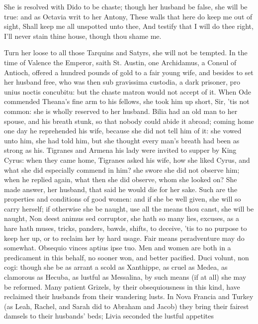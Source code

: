 {She is resolved with Dido to be chaste; though her husband be false,
she will be true: and as Octavia writ to her Antony,
These walls that here do keep me out of sight,
Shall keep me all unspotted unto thee,
And testify that I will do thee right,
I'll never stain thine house, though thou shame me.

Turn her loose to all those Tarquins and Satyrs, she will not be
tempted. In the time of Valence the Emperor, saith St. Austin,
one Archidamus, a Consul of Antioch, offered a hundred pounds of gold
to a fair young wife, and besides to set her husband free, who was then
sub gravissima custodia, a dark prisoner, pro unius noctis concubitu:
but the chaste matron would not accept of it. When Ode commended
Theana's fine arm to his fellows, she took him up short, Sir, 'tis not
common: she is wholly reserved to her husband. Bilia had an old
man to her spouse, and his breath stunk, so that nobody could abide it
abroad; coming home one day he reprehended his wife, because she did
not tell him of it: she vowed unto him, she had told him, but she
thought every man's breath had been as strong as his. Tigranes
and Armena his lady were invited to supper by King Cyrus: when they
came home, Tigranes asked his wife, how she liked Cyrus, and what she
did especially commend in him? she swore she did not observe him; when
he replied again, what then she did observe, whom she looked on? She
made answer, her husband, that said he would die for her sake. Such are
the properties and conditions of good women: and if she be well given,
she will so carry herself; if otherwise she be naught, use all the
means thou canst, she will be naught, Non deest animus sed corruptor,
she hath so many lies, excuses, as a hare hath muses, tricks, panders,
bawds, shifts, to deceive, 'tis to no purpose to keep her up, or to
reclaim her by hard usage. Fair means peradventure may do somewhat.
 Obsequio vinces aptius ipse tuo. Men and women are both in a
predicament in this behalf, no sooner won, and better pacified. Duci
volunt, non cogi: though she be as arrant a scold as Xanthippe, as
cruel as Medea, as clamorous as Hecuba, as lustful as Messalina, by
such means (if at all) she may be reformed. Many patient Grizels,
by their obsequiousness in this kind, have reclaimed their husbands
from their wandering lusts. In Nova Francia and Turkey (as Leah,
Rachel, and Sarah did to Abraham and Jacob) they bring their fairest
damsels to their husbands' beds; Livia seconded the lustful appetites
}
